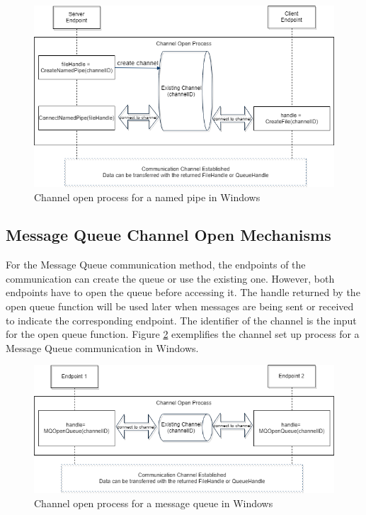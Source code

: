 \documentclass[12pt,oneside]{book}
\begin{document}
\begin{figure}[H]
\centerline{\includegraphics[scale=0.5]{Figures/namepipechannelopen}}
 \caption{Channel open process for a named pipe in Windows}
\label{namedpipeopen}
\end{figure}

\subsection{Message Queue Channel Open Mechanisms} 
For the Message Queue communication method, the endpoints of the communication can create the queue or use the existing one. However, both endpoints have to open the queue before accessing it. The handle returned by the open queue function will be used later when messages are being sent or received to indicate the corresponding endpoint. The identifier of the channel is the input for the open queue function. \cite{WinMSMQ} Figure \ref{msmqopen} exemplifies the channel set up process for a Message Queue communication in Windows.

\begin{figure}[H]
\centerline{\includegraphics[scale=0.5]{Figures/msmqchannelopen}}
 \caption{Channel open process for a message queue in Windows}
\label{msmqopen}
\end{figure}
\end{document}
